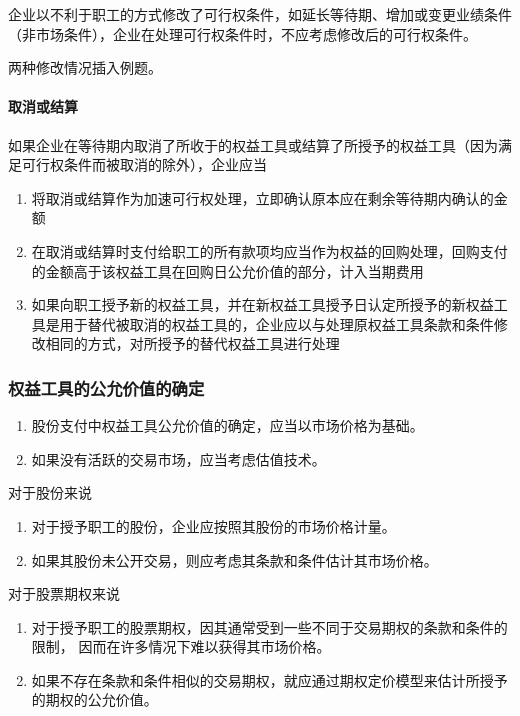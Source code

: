 \documentclass[UTF8,12pt]{ctexart}
\numberwithin{equation}{section} %
\numberwithin{figure}{section}
\numberwithin{table}{section}
\begin{document}
	企业以不利于职工的方式修改了可行权条件，如延长等待期、增加或变更业绩条件（非市场条件），企业在处理可行权条件时，不应考虑修改后的可行权条件。
	
	两种修改情况插入例题。
	
	\paragraph{取消或结算}
	如果企业在等待期内取消了所收于的权益工具或结算了所授予的权益工具（因为满足可行权条件而被取消的除外），企业应当
	\begin{enumerate}
		\item 将取消或结算作为加速可行权处理，立即确认原本应在剩余等待期内确认的金额
		
		\item 在取消或结算时支付给职工的所有款项均应当作为权益的回购处理，回购支付的金额高于该权益工具在回购日公允价值的部分，计入当期费用
		
		\item 如果向职工授予新的权益工具，并在新权益工具授予日认定所授予的新权益工具是用于替代被取消的权益工具的，企业应以与处理原权益工具条款和条件修改相同的方式，对所授予的替代权益工具进行处理
	\end{enumerate}
	
	
	\subsubsection{权益工具的公允价值的确定}
	\begin{enumerate}
		\item 股份支付中权益工具公允价值的确定，应当以市场价格为基础。
		
		\item 如果没有活跃的交易市场，应当考虑估值技术。
	\end{enumerate}
	
	对于股份来说
	\begin{enumerate}
		\item 对于授予职工的股份，企业应按照其股份的市场价格计量。
		
		\item 如果其股份未公开交易，则应考虑其条款和条件估计其市场价格。
		
	\end{enumerate}
	
	对于股票期权来说
	\begin{enumerate}
		\item 对于授予职工的股票期权，因其通常受到一些不同于交易期权的条款和条件的限制， 因而在许多情况下难以获得其市场价格。
		
		\item 如果不存在条款和条件相似的交易期权，就应通过期权定价模型来估计所授予的期权的公允价值。
	\end{enumerate}
\end{document}
